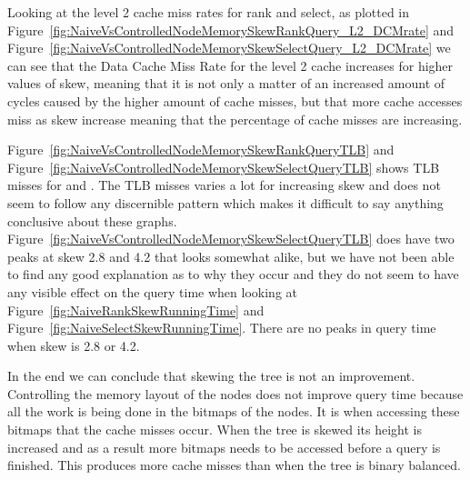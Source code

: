 Looking at the level 2 cache miss rates for rank and select, as plotted in Figure~\ref{fig:NaiveVsControlledNodeMemorySkewRankQuery_L2_DCMrate} and Figure~\ref{fig:NaiveVsControlledNodeMemorySkewSelectQuery_L2_DCMrate} we can see that the Data Cache Miss Rate for the level 2 cache increases for higher values of skew, meaning that it is not only a matter of an increased amount of cycles caused by the higher amount of cache misses, but that more cache accesses miss as skew increase meaning that the percentage of cache misses are increasing.

Figure~\ref{fig:NaiveVsControlledNodeMemorySkewRankQueryTLB} and Figure~\ref{fig:NaiveVsControlledNodeMemorySkewSelectQueryTLB} shows TLB misses for  and . 
The TLB misses varies a lot for increasing skew and does not seem to follow any discernible pattern which makes it difficult to say anything conclusive about these graphs. 
Figure~\ref{fig:NaiveVsControlledNodeMemorySkewSelectQueryTLB} does have two peaks at skew 2.8 and 4.2 that looks somewhat alike, but we have not been able to find any good explanation as to why they occur and they do not seem to have any visible effect on the query time when looking at Figure~\ref{fig:NaiveRankSkewRunningTime} and Figure~\ref{fig:NaiveSelectSkewRunningTime}.
There are no peaks in query time when skew is 2.8 or 4.2.

In the end we can conclude that skewing the tree is not an improvement. 
Controlling the memory layout of the nodes does not improve query time because all the work is being done in the bitmaps of the nodes.
It is when accessing these bitmaps that the cache misses occur.
When the tree is skewed its height is increased and as a result more bitmaps needs to be accessed before a query is finished. 
This produces more cache misses than when the tree is binary balanced.



